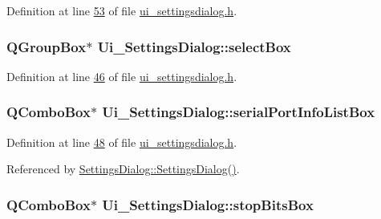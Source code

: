 Definition at line \hyperlink{a00141_source_l00053}{53} of file \hyperlink{a00141_source}{ui\+\_\+settingsdialog.\+h}.

\hypertarget{a00082_aea3871481f7ecb94f1835e519631f9a2}{
\subsubsection[{select\+Box}]{\setlength{\rightskip}{0pt plus 5cm}Q\+Group\+Box$\ast$ Ui\+\_\+\+Settings\+Dialog\+::select\+Box}}\label{a00082_aea3871481f7ecb94f1835e519631f9a2}


Definition at line \hyperlink{a00141_source_l00046}{46} of file \hyperlink{a00141_source}{ui\+\_\+settingsdialog.\+h}.

\hypertarget{a00082_a323eca0d6d4b94d2d41c7737fe8b2282}{
\subsubsection[{serial\+Port\+Info\+List\+Box}]{\setlength{\rightskip}{0pt plus 5cm}Q\+Combo\+Box$\ast$ Ui\+\_\+\+Settings\+Dialog\+::serial\+Port\+Info\+List\+Box}}\label{a00082_a323eca0d6d4b94d2d41c7737fe8b2282}


Definition at line \hyperlink{a00141_source_l00048}{48} of file \hyperlink{a00141_source}{ui\+\_\+settingsdialog.\+h}.



Referenced by \hyperlink{a00131_source_l00052}{Settings\+Dialog\+::\+Settings\+Dialog()}.

\hypertarget{a00082_ad61890c5fd0acc9e72385efd02df90c0}{
\subsubsection[{stop\+Bits\+Box}]{\setlength{\rightskip}{0pt plus 5cm}Q\+Combo\+Box$\ast$ Ui\+\_\+\+Settings\+Dialog\+::stop\+Bits\+Box}}\label{a00082_ad61890c5fd0acc9e72385efd02df90c0}


